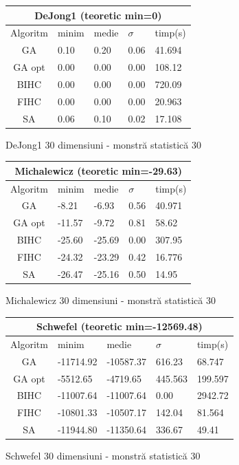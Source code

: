 \documentclass{article}
\begin{document}
\begin{figure}[!h]
\begin{tabular}{||c|||l|l|l|l||}
  \hline
  \multicolumn{5}{||c||}{DeJong1 (teoretic min=0)} \\ \hline
  Algoritm & minim & medie & $\sigma$ & timp(s) \\ \hline \hline
  GA & 0.10 & 0.20 & 0.06 & 41.694 \\ \hline
  GA opt & 0.00 & 0.00 & 0.00 & 108.12 \\ \hline
  BIHC & 0.00 & 0.00 & 0.00 & 720.09\\ \hline
  FIHC & 0.00 & 0.00 & 0.00 & 20.963 \\ \hline
  SA & 0.06 & 0.10 & 0.02 & 17.108 \\ \hline
\end{tabular}
\caption{DeJong1 30 dimensiuni - monstră statistică 30} 
\end{figure}

\begin{figure}[!h]
\begin{tabular}{||c|||l|l|l|l||}
  \hline
  \multicolumn{5}{||c||}{Michalewicz (teoretic min=-29.63)} \\ \hline
  Algoritm & minim & medie & $\sigma$ & timp(s) \\ \hline \hline
  GA & -8.21 & -6.93 & 0.56 & 40.971 \\ \hline
  GA opt & -11.57 & -9.72 & 0.81 & 58.62 \\ \hline
  BIHC & -25.60 & -25.69 & 0.00 & 307.95\\ \hline
  FIHC & -24.32 & -23.29 & 0.42 & 16.776 \\ \hline
  SA & -26.47 & -25.16 & 0.50 & 14.95 \\ \hline
\end{tabular}
\caption{Michalewicz 30 dimensiuni - monstră statistică 30} 
\end{figure}

\begin{figure}[!h]
\begin{tabular}{||c|||l|l|l|l||}
  \hline
  \multicolumn{5}{||c||}{Schwefel (teoretic min=-12569.48)} \\ \hline
  Algoritm & minim & medie & $\sigma$ & timp(s) \\ \hline \hline
  GA & -11714.92 & -10587.37 & 616.23 & 68.747 \\ \hline
  GA opt & -5512.65 & -4719.65 & 445.563 & 199.597 \\ \hline
  BIHC & -11007.64 & -11007.64 & 0.00 & 2942.72\\ \hline
  FIHC & -10801.33 & -10507.17 & 142.04 & 81.564 \\ \hline
  SA & -11944.80 & -11350.64 & 336.67 & 49.41 \\ \hline
\end{tabular}
\caption{Schwefel 30 dimensiuni - monstră statistică 30} 
\end{figure}
\end{document}
